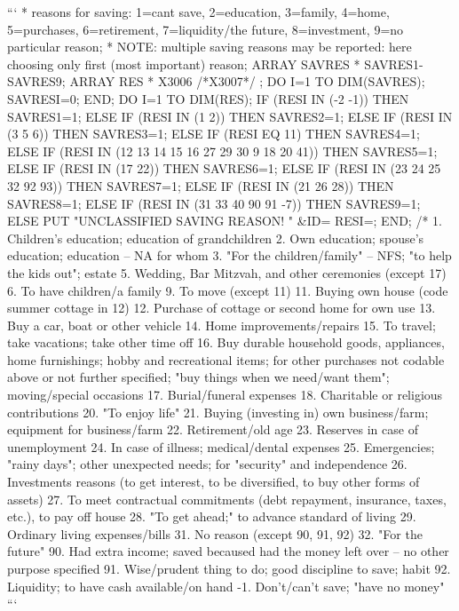 ```
*   reasons for saving: 1=cant save, 2=education, 3=family, 4=home,
    5=purchases, 6=retirement, 7=liquidity/the future, 8=investment,
    9=no particular reason;
*   NOTE: multiple saving reasons may be reported: here choosing only
    first (most important) reason;
    ARRAY SAVRES {*} SAVRES1-SAVRES9;
    ARRAY RES {*} X3006 /*X3007*/ ;
    DO I=1 TO DIM(SAVRES);
      SAVRES{I}=0;
    END;
    DO I=1 TO DIM(RES);
      IF (RES{I} IN (-2 -1)) THEN SAVRES{1}=1;
      ELSE IF (RES{I} IN (1 2)) THEN SAVRES{2}=1;
      ELSE IF (RES{I} IN (3 5 6)) THEN SAVRES{3}=1;
      ELSE IF (RES{I} EQ 11) THEN SAVRES{4}=1;
      ELSE IF (RES{I} IN (12 13 14 15 16 27 29 30 9 18 20 41)) THEN
        SAVRES{5}=1;
      ELSE IF (RES{I} IN (17 22)) THEN SAVRES{6}=1;
      ELSE IF (RES{I} IN (23 24 25 32 92 93)) THEN SAVRES{7}=1;
      ELSE IF (RES{I} IN (21 26 28)) THEN SAVRES{8}=1;
      ELSE IF (RES{I} IN (31 33 40 90 91 -7)) THEN SAVRES{9}=1;
      ELSE PUT "UNCLASSIFIED SAVING REASON! " &ID= RES{I}=;
    END;
/*
    1.  Children's education; education of grandchildren
    2.  Own education; spouse's education; education -- NA for whom
    3.  "For the children/family"  -- NFS; "to help the kids
        out"; estate
    5.  Wedding, Bar Mitzvah, and other ceremonies (except 17)
    6.  To have children/a family
    9.  To move (except 11)
   11.  Buying own house (code summer cottage in 12)
   12.  Purchase of cottage or second home for own use
   13.  Buy a car, boat or other vehicle
   14.  Home improvements/repairs
   15.  To travel; take vacations; take other time off
   16.  Buy durable household goods, appliances, home
        furnishings; hobby and recreational items; for other
        purchases not codable above or not further specified;
        "buy things when we need/want them"; moving/special occasions
   17.  Burial/funeral expenses
   18.  Charitable or religious contributions
   20.  "To enjoy life"
   21.  Buying (investing in) own business/farm; equipment for
        business/farm
   22.  Retirement/old age
   23.  Reserves in case of unemployment
   24.  In case of illness; medical/dental expenses
   25.  Emergencies; "rainy days"; other unexpected needs; for
       "security" and independence
   26.  Investments reasons (to get interest, to be
        diversified, to buy other forms of assets)
   27.  To meet contractual commitments (debt repayment,
        insurance, taxes, etc.), to pay off house
   28.  "To get ahead;" to advance standard of living
   29.  Ordinary living expenses/bills
   31.  No reason (except 90, 91, 92)
   32.  "For the future"
   90.  Had extra income; saved becaused had the money left
        over -- no other purpose specified
   91.  Wise/prudent thing to do; good discipline to save; habit
   92.  Liquidity; to have cash available/on hand
   -1.  Don't/can't save; "have no money"
  ```